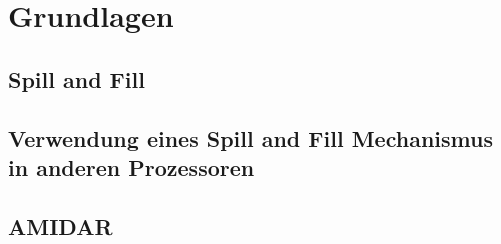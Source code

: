 \chapter{Grundlagen}
\label{cha:Grundlagen}

\section{Spill and Fill}
\section{Verwendung eines Spill and Fill Mechanismus in anderen Prozessoren}
\section{AMIDAR}